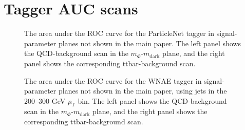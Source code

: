 \documentclass[11pt]{article}
\begin{document}
\section*{Tagger AUC scans}
\label{sec:pnet-auc-extra-axes}
\begin{figure}[H]
  \centering
  \caption{The area under the ROC curve for the ParticleNet tagger in signal-parameter planes not shown in the main paper. The left panel shows the QCD-background scan in the $m_{\Phi}$-$m_{\mathrm{dark}}$ plane, and the right panel shows the corresponding ttbar-background scan.}
  \label{fig:auc-pnet-extra-summary}
\end{figure}
\clearpage
\begin{figure}[H]
  \centering
  \caption{The area under the ROC curve for the WNAE tagger in signal-parameter planes not shown in the main paper, using jets in the 200--300 GeV $p_{\mathrm{T}}$ bin. The left panel shows the QCD-background scan in the $m_{\Phi}$-$m_{\mathrm{dark}}$ plane, and the right panel shows the corresponding ttbar-background scan.}
  \label{fig:auc-wnae-extra-summary}
\end{figure}
\clearpage
\end{document}
